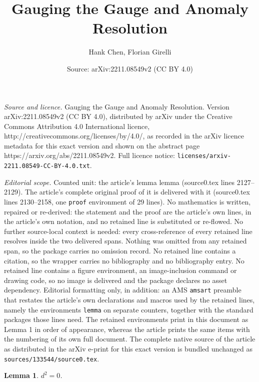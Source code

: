 \documentclass[10pt,a4paper]{amsart}
\title{Gauging the Gauge and Anomaly Resolution}
\author{Hank Chen, Florian Girelli}
\date{Source: arXiv:2211.08549v2 (CC BY 4.0)}
\newtheorem{lemma}{Lemma}
\begin{document}
\maketitle

\noindent\emph{Source and licence.} Gauging the Gauge and Anomaly Resolution. Version arXiv:2211.08549v2 (CC BY 4.0), distributed by arXiv under the Creative Commons Attribution 4.0 International licence, http://creativecommons.org/licenses/by/4.0/, as recorded in the arXiv licence metadata for this exact version and shown on the abstract page https://arxiv.org/abs/2211.08549v2. Full licence notice: \texttt{licenses/arxiv-2211.08549-CC-BY-4.0.txt}.\par\smallskip

\noindent\textit{Editorial scope.} Counted unit: the article's lemma lemma (source0.tex lines 2127--2129). The article's complete original proof of it is delivered with it (source0.tex lines 2130--2158, one \texttt{proof} environment of 29 lines). No mathematics is written, repaired or re-derived: the statement and the proof are the article's own lines, in the article's own notation, and no retained line is substituted or re-flowed.  No further source-local context is needed: every cross-reference of every retained line resolves inside the two delivered spans.  Nothing was omitted from any retained span, so the package carries no omission record.  No retained line contains a citation, so the wrapper carries no bibliography and no bibliography entry.  No retained line contains a figure environment, an image-inclusion command or drawing code, so no image is delivered and the package declares no asset dependency.  Editorial formatting only, in addition: an AMS \texttt{amsart} preamble that restates the article's own declarations and macros used by the retained lines, namely the environments \texttt{lemma} on separate counters, together with the standard packages those lines need.  The retained environments print in this document as Lemma 1 in order of appearance, whereas the article prints the same items with the numbering of its own full document.  The complete native source of the article as distributed in the arXiv e-print for this exact version is bundled unchanged as \texttt{sources/133544/source0.tex}.
\begin{lemma}
$d^2=0$.
\end{lemma}
\end{document}
